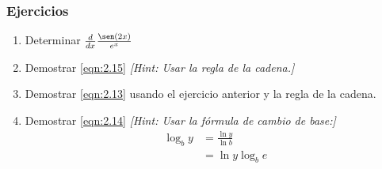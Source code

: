 \subsubsection{Ejercicios}

\begin{enumerate}
        \item Determinar $\frac{d}{dx}\frac{\sen(2x)}{e^x}$
	\item Demostrar \cref{eqn:2.15} \textsl{[Hint: Usar la regla de la cadena.]}
	\item Demostrar \cref{eqn:2.13} usando el ejercicio anterior y la regla de la cadena.
	\item Demostrar \cref{eqn:2.14} \textsl{[Hint: Usar la fórmula de cambio de base:]
		\begin{align*}
		\log_b y&=\frac{\ln y}{\ln b}\\
		&=\ln y\log_b e
		\end{align*}}
\end{enumerate}